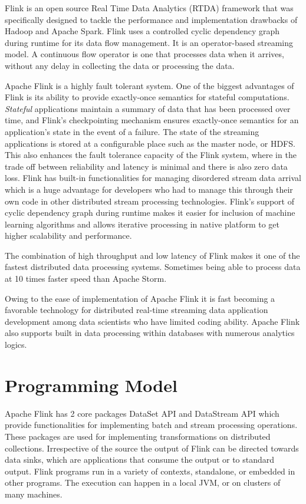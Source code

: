 Flink is an open source Real Time Data Analytics (RTDA) framework that was specifically designed to tackle the performance and implementation drawbacks of Hadoop and Apache Spark. Flink uses a controlled cyclic dependency graph during runtime for its data flow management. It is an operator-based streaming model. A continuous flow operator is one that processes data when it arrives, without any delay in collecting the data or processing the data\cite{link5}.


Apache Flink is a highly fault tolerant system. One of the biggest advantages of Flink is its ability to provide exactly-once semantics for stateful computations. \emph{Stateful} applications maintain a summary of data that has been processed over time, and Flink's checkpointing mechanism ensures exactly-once semantics for an application's state in the event of a failure. The state of the streaming applications is stored at a configurable place such as the master node, or HDFS. This also enhances the fault tolerance capacity of the Flink system, where in the trade off between reliability and latency is minimal and there is also zero data loss. Flink has built-in functionalities for managing disordered stream data arrival which is a huge advantage for developers who had to manage this through their own code in other distributed stream processing technologies. Flink's support of cyclic dependency graph during runtime makes it easier for inclusion of machine learning algorithms and allows iterative processing in native platform to get higher scalability and performance.

The combination of high throughput and low latency of Flink makes it one of the fastest distributed data processing  systems. Sometimes being able to process data at 10 times faster speed than Apache Storm.

Owing to the ease of implementation of Apache Flink it is fast becoming a favorable technology for distributed real-time streaming data application development among data scientists who have limited coding ability. Apache Flink also supports built in data processing within databases with numerous analytics logics.~\cite{link3} 


\section{Programming Model}

Apache Flink has 2 core packages DataSet API and DataStream API which provide functionalities for implementing batch and stream processing operations. These packages are used for implementing  transformations on distributed collections. Irrespective of the source the output of Flink can be directed towards data sinks, which are applications that consume the output or to standard output. Flink programs run in a variety of contexts, standalone, or embedded in other programs. The execution can happen in a local JVM, or on clusters of many machines.~\cite{link8}

